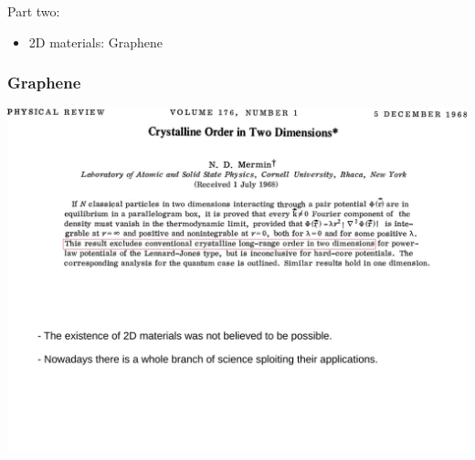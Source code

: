 \documentclass{beamer}
\begin{document}

\begin{frame}

Part two:
\begin{itemize}
\item 2D materials: Graphene 
\end{itemize}

\end{frame}


\begin{frame}

\frametitle{Graphene}
\vspace{0.5cm}
\begin{center}
 \includegraphics[width=0.85\linewidth]{Pictures/Graphene/mermin.pdf}
\end{center}

\end{frame}

\end{document}
